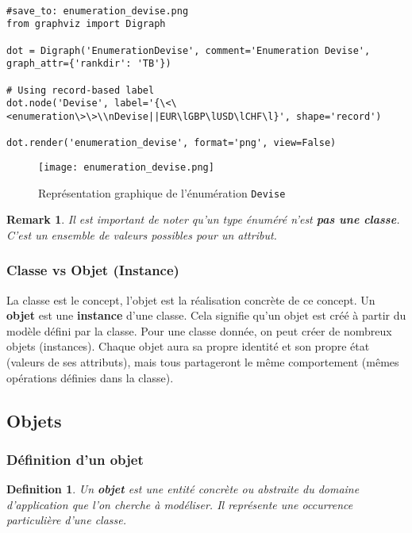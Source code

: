 \documentclass{article}
\newtheorem{definition}{Definition}
\newtheorem{remark}{Remark}
\begin{document}
\begin{verbatim}

#save_to: enumeration_devise.png
from graphviz import Digraph

dot = Digraph('EnumerationDevise', comment='Enumeration Devise', graph_attr={'rankdir': 'TB'})

# Using record-based label
dot.node('Devise', label='{\<\<enumeration\>\>\\nDevise||EUR\lGBP\lUSD\lCHF\l}', shape='record')

dot.render('enumeration_devise', format='png', view=False)

\end{verbatim}

\begin{figure}[h]
    \centering
    \texttt{[image: enumeration\_devise.png]}
    \caption{Représentation graphique de l'énumération \texttt{Devise}}
    \label{fig:enumeration_devise}
\end{figure}

\begin{remark}
Il est important de noter qu'un type énuméré n'est \textbf{pas une classe}. C'est un ensemble de valeurs possibles pour un attribut.
\end{remark}


\subsubsection{Classe vs Objet (Instance)}
La classe est le concept, l'objet est la réalisation concrète de ce concept. Un \textbf{objet} est une \textbf{instance} d'une classe.  Cela signifie qu'un objet est créé à partir du modèle défini par la classe.  Pour une classe donnée, on peut créer de nombreux objets (instances). Chaque objet aura sa propre identité et son propre état (valeurs de ses attributs), mais tous partageront le même comportement (mêmes opérations définies dans la classe).


\subsection{Objets}

\subsubsection{Définition d'un objet}
\begin{definition}
Un \textbf{objet} est une entité concrète ou abstraite du domaine d'application que l'on cherche à modéliser. Il représente une occurrence particulière d'une classe.
\end{definition}
\end{document}
